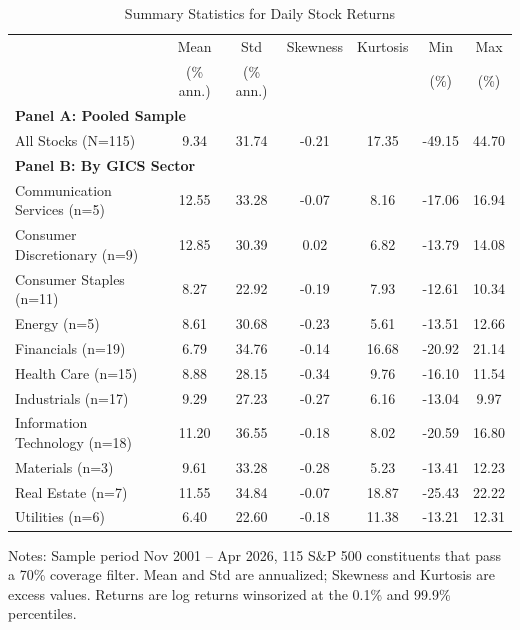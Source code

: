 
\begin{table}[htbp]
\centering
\caption{Summary Statistics for Daily Stock Returns}
\label{tab:summary_stats}
\small
\begin{tabular}{lcccccc}
\toprule
 & Mean & Std & Skewness & Kurtosis & Min & Max \\
 & (\% ann.) & (\% ann.) & & & (\%) & (\%) \\
\midrule
\multicolumn{7}{l}{\textbf{Panel A: Pooled Sample}} \\
All Stocks (N=115) & 9.34 & 31.74 & -0.21 & 17.35 & -49.15 & 44.70 \\
\midrule
\multicolumn{7}{l}{\textbf{Panel B: By GICS Sector}} \\
Communication Services (n=5) & 12.55 & 33.28 & -0.07 & 8.16 & -17.06 & 16.94 \\
Consumer Discretionary (n=9) & 12.85 & 30.39 & 0.02 & 6.82 & -13.79 & 14.08 \\
Consumer Staples (n=11) & 8.27 & 22.92 & -0.19 & 7.93 & -12.61 & 10.34 \\
Energy (n=5) & 8.61 & 30.68 & -0.23 & 5.61 & -13.51 & 12.66 \\
Financials (n=19) & 6.79 & 34.76 & -0.14 & 16.68 & -20.92 & 21.14 \\
Health Care (n=15) & 8.88 & 28.15 & -0.34 & 9.76 & -16.10 & 11.54 \\
Industrials (n=17) & 9.29 & 27.23 & -0.27 & 6.16 & -13.04 & 9.97 \\
Information Technology (n=18) & 11.20 & 36.55 & -0.18 & 8.02 & -20.59 & 16.80 \\
Materials (n=3) & 9.61 & 33.28 & -0.28 & 5.23 & -13.41 & 12.23 \\
Real Estate (n=7) & 11.55 & 34.84 & -0.07 & 18.87 & -25.43 & 22.22 \\
Utilities (n=6) & 6.40 & 22.60 & -0.18 & 11.38 & -13.21 & 12.31 \\
\bottomrule
\end{tabular}
\begin{tablenotes}\small
\item Notes: Sample period Nov 2001 -- Apr 2026, 115 S\&P 500 constituents that pass a 70\% coverage filter. Mean and Std are annualized; Skewness and Kurtosis are excess values. Returns are log returns winsorized at the 0.1\% and 99.9\% percentiles.
\end{tablenotes}
\end{table}
